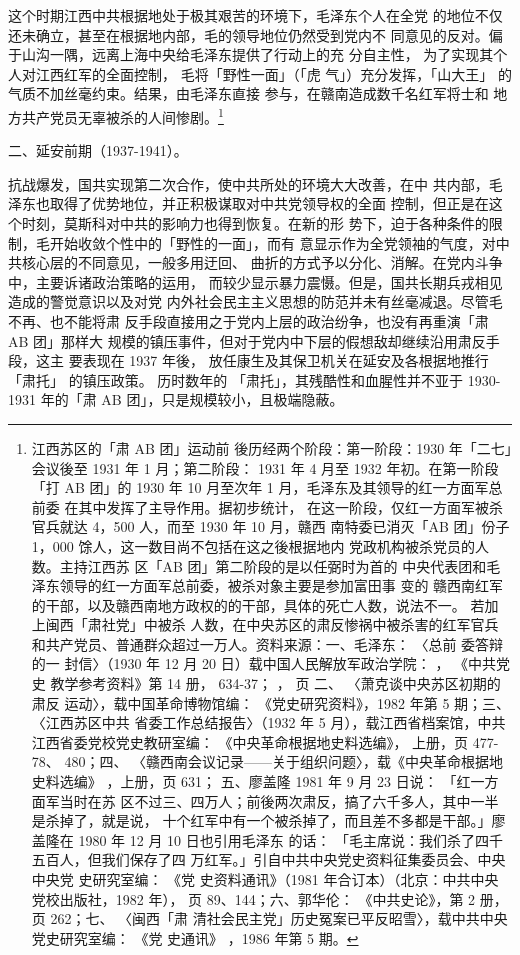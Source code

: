 这个时期江西中共根据地处于极其艰苦的环境下，毛泽东个人在全党 的地位不仅
还未确立，甚至在根据地内部，毛的领导地位仍然受到党内不 同意见的反对。偏
于山沟一隅，远离上海中央给毛泽东提供了行动上的充 分自主性， 为了实现其个
人对江西红军的全面控制， 毛将「野性一面」（「虎 气」）充分发挥，「山大王」
的气质不加丝毫约束。结果，由毛泽东直接 参与，在赣南造成数千名红军将士和
地方共产党员无辜被杀的人间惨剧。\footnote{江西苏区的「肃 AB 团」运动前
後历经两个阶段：第一阶段：1930 年「二七」会议後至 1931 年 1 月；第二阶段：
1931 年 4 月至 1932 年初。在第一阶段「打 AB 团」的 1930 年 10 月至次年 1
月，毛泽东及其领导的红一方面军总前委 在其中发挥了主导作用。据初步统计，
在这一阶段，仅红一方面军被杀官兵就达 4，500 人，而至 1930 年 10 月，赣西
南特委已消灭「AB 团」份子 1，000 馀人，这一数目尚不包括在这之後根据地内
党政机构被杀党员的人数。主持江西苏 区「AB 团」第二阶段的是以任弼时为首的
中央代表团和毛泽东领导的红一方面军总前委，被杀对象主要是参加富田事 变的
赣西南红军的干部，以及赣西南地方政权的的干部，具体的死亡人数，说法不一。
若加上闽西「肃社党」中被杀 人数，在中央苏区的肃反惨祸中被杀害的红军官兵
和共产党员、普通群众超过一万人。资料来源：一、毛泽东： 〈总前 委答辩的一
封信〉（1930 年 12 月 20 日）载中国人民解放军政治学院： ， 《中共党史
教学参考资料》第 14 册， 634-37； ， 页 二、 〈萧克谈中央苏区初期的肃反
运动〉，载中国革命博物馆编： 《党史研究资料》，1982 年第 5 期；三、
〈江西苏区中共 省委工作总结报告〉（1932 年 5 月），载江西省档案馆，中共
江西省委党校党史教研室编： 《中央革命根据地史料选编》， 上册，页 477-78、
480；四、 〈赣西南会议记录——关于组织问题〉，载《中央革命根据地史料选编》
，上册，页 631； 五、廖盖隆 1981 年 9 月 23 日说： 「红一方面军当时在苏
区不过三、四万人；前後两次肃反，搞了六千多人，其中一半 是杀掉了，就是说，
十个红军中有一个被杀掉了，而且差不多都是干部。」廖盖隆在 1980 年 12 月
10 日也引用毛泽东 的话： 「毛主席说：我们杀了四千五百人，但我们保存了四
万红军。」引自中共中央党史资料征集委员会、中央中央党 史研究室编： 《党
史资料通讯》（1981 年合订本）（北京：中共中央党校出版社，1982 年），
页 89、144；六、郭华伦： 《中共史论》，第 2 册，页 262；七、 〈闽西「肃
清社会民主党」历史冤案已平反昭雪〉，载中共中央党史研究室编： 《党 史通讯》
，1986 年第 5 期。}

二、延安前期（1937-1941）。

抗战爆发，国共实现第二次合作，使中共所处的环境大大改善，在中
共内部，毛泽东也取得了优势地位，并正积极谋取对中共党领导权的全面
控制，但正是在这个时刻，莫斯科对中共的影响力也得到恢复。在新的形
势下，迫于各种条件的限制，毛开始收敛个性中的「野性的一面」，而有
意显示作为全党领袖的气度，对中共核心层的不同意见，一般多用迂回、
曲折的方式予以分化、消解。在党内斗争中，主要诉诸政治策略的运用，
而较少显示暴力震慑。但是，国共长期兵戎相见造成的警觉意识以及对党
内外社会民主主义思想的防范并未有丝毫减退。尽管毛不再、也不能将肃
反手段直接用之于党内上层的政治纷争，也没有再重演「肃 AB 团」那样大
规模的镇压事件，但对于党内中下层的假想敌却继续沿用肃反手段，这主
要表现在 1937 年後，
放任康生及其保卫机关在延安及各根据地推行
「肃托」
的镇压政策。
历时数年的
「肃托」，其残酷性和血腥性并不亚于 1930-1931
年的「肃 AB 团」，只是规模较小，且极端隐蔽。


